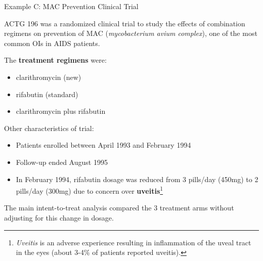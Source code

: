 \documentclass[envcountsect, 10pt, portrait, palatino]{beamer}
\begin{document}
\begin{frame}{Example C: MAC Prevention Clinical Trial}

ACTG 196 was a randomized clinical trial to study the effects of
combination regimens on prevention of MAC ({\em mycobacterium avium
complex}), one of the most common OIs in AIDS patients.

The {\bf treatment regimens} were:
\begin{itemize}
\item clarithromycin (new)
\item rifabutin (standard)
\item clarithromycin plus rifabutin
\end{itemize}
\newpage
Other characteristics of trial:
\begin{itemize}
\item Patients enrolled between April 1993 and February 1994
\item Follow-up ended August 1995
\item In February 1994, rifabutin dosage was reduced from 3 pills/day
(450mg) to 2 pills/day (300mg) due to concern over {\bf uveitis}\footnote{\footnotesize
{\em Uveitis} is an adverse experience resulting in inflammation
of the uveal tract in the eyes (about 3-4\% of patients
reported uveitis).}
\end{itemize}

The main intent-to-treat analysis compared the 3 treatment arms
without adjusting for this change in dosage.
\end{frame}
\end{document}

